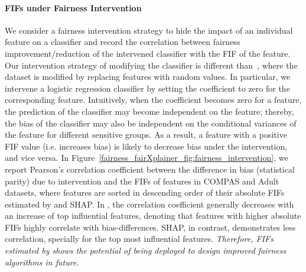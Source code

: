 \paragraph{FIFs under Fairness Intervention} We consider a fairness intervention strategy to hide the impact of an individual feature on a classifier and record the correlation between fairness improvement/reduction of the intervened classifier with the FIF of the feature. Our intervention strategy of modifying the classifier is different than~\cite{datta2016algorithmic}, where the dataset is modified by replacing features with random values. In particular, we intervene a logistic regression classifier by setting the coefficient to zero for the corresponding feature. Intuitively, when the coefficient becomes zero for a feature, the prediction of the classifier may become independent on the feature; thereby, the bias of the classifier may also be independent on the conditional variances of the feature for different sensitive groups.  As a result, a feature with a positive FIF value (i.e. increases bias) is likely to decrease bias under the intervention, and vice versa. In Figure~\ref{fairness_fairXplainer_fig:fairness_intervention}, we report Pearson's correlation coefficient between the difference in bias (statistical parity) due to intervention and the FIFs of features in COMPAS and Adult datasets, where features are sorted in descending order of their absolute FIFs estimated by {\fairXplainer} and SHAP. In {\fairXplainer}, the correlation coefficient generally decreases with an increase of top influential features, denoting that features with higher absolute FIFs highly correlate with bias-differences. SHAP, in contrast, demonstrates less correlation, specially for the top most influential features. \emph{Therefore, FIFs estimated by {\fairXplainer} shows the potential of being deployed to design improved fairness algorithms in future.}




























